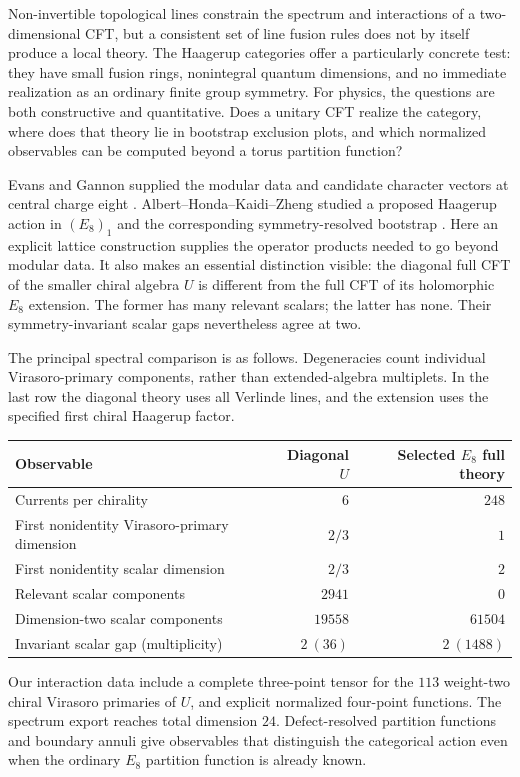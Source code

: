 \documentclass[11pt,a4paper]{article}
\theoremstyle{definition}
\begin{document}
Non-invertible topological lines constrain the spectrum and interactions
of a two-dimensional CFT, but a consistent set of line fusion rules does
not by itself produce a local theory. The Haagerup categories offer a
particularly concrete test: they have small fusion rings, nonintegral
quantum dimensions, and no immediate realization as an ordinary finite
group symmetry. For physics, the questions are both constructive and
quantitative. Does a unitary CFT realize the category, where does that
theory lie in bootstrap exclusion plots, and which normalized observables
can be computed beyond a torus partition function?

Evans and Gannon supplied the modular data and candidate character
vectors at central charge eight \cite[Sections 2.4 and 5]{EG}.
Albert--Honda--Kaidi--Zheng studied a proposed Haagerup action in
$(E_8)_1$ and the corresponding symmetry-resolved bootstrap
\cite{AHKZ}. Here an explicit lattice construction supplies the
operator products needed to go beyond modular data. It also makes an
essential distinction visible: the diagonal full CFT of the smaller
chiral algebra $U$ is different from the full CFT of its holomorphic
$E_8$ extension. The former has many relevant scalars; the latter has
none. Their symmetry-invariant scalar gaps nevertheless agree at two.

The principal spectral comparison is as follows. Degeneracies count
individual Virasoro-primary components, rather than extended-algebra
multiplets. In the last row the diagonal theory uses all Verlinde
lines, and the extension uses the specified first chiral Haagerup factor.
\begin{center}\small
\begin{tabular}{@{}lrr@{}}
\toprule
Observable&Diagonal $U$&Selected $E_8$ full theory\\
\midrule
Currents per chirality&$6$&$248$\\
First nonidentity Virasoro-primary dimension&$2/3$&$1$\\
First nonidentity scalar dimension&$2/3$&$2$\\
Relevant scalar components&$2941$&$0$\\
Dimension-two scalar components&$19558$&$61504$\\
Invariant scalar gap (multiplicity)&$2\ (36)$&$2\ (1488)$\\
\bottomrule
\end{tabular}
\end{center}
Our interaction data include a complete three-point tensor for the
$113$ weight-two chiral Virasoro primaries of $U$, and explicit
normalized four-point functions. The spectrum export reaches total
dimension $24$. Defect-resolved partition functions and boundary
annuli give observables that distinguish the categorical action even
when the ordinary $E_8$ partition function is already known.
\end{document}
